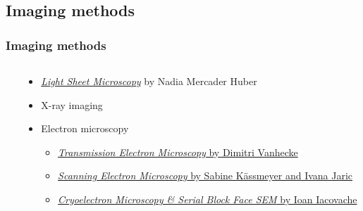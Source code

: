 \begin{frame}
\begin{columns}
\begin{column}{0.38\textwidth}
{%
      }%
    \end{column}%
  \end{columns}%
\end{frame}

\subsection{Imaging methods}
\begin{frame}
  \frametitle{Imaging methods}
  \begin{columns}
    \begin{column}{0.49\textwidth}
    \end{column}
    \begin{column}{0.49\textwidth}
      \begin{itemize}
        \item \href{https://ilias.unibe.ch/goto_ilias3_unibe_sess_3022933.html}{\emph{Light Sheet Microscopy}} by Nadia Mercader Huber
        \item X-ray imaging
        \item Electron microscopy
          \begin{itemize}
            \item \href{https://ilias.unibe.ch/goto_ilias3_unibe_sess_3022941.html}{\emph{Transmission Electron Microscopy} by Dimitri Vanhecke}
            \item \href{https://ilias.unibe.ch/goto_ilias3_unibe_sess_3022943.html}{\emph{Scanning Electron Microscopy} by Sabine Kässmeyer and Ivana Jaric}
            \item \href{https://ilias.unibe.ch/goto_ilias3_unibe_sess_3022945.html}{\emph{Cryoelectron Microscopy \& Serial Block Face SEM} by Ioan Iacovache}
          \end{itemize}
      \end{itemize}
    \end{column}
  \end{columns}
\end{frame}

